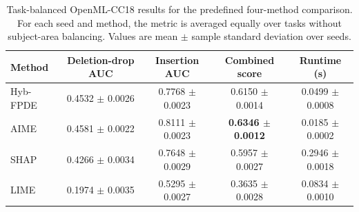 \begin{table}[!tbp]
    \caption{Task-balanced OpenML-CC18 results for the predefined four-method comparison. For each seed and method, the metric is averaged equally over tasks without subject-area balancing. Values are mean $\pm$ sample standard deviation over seeds.}
    \label{tab:task_weighted_results}
    \centering
    \begin{tabular}{lcccc}
        \toprule
        Method & Deletion-drop AUC & Insertion AUC & Combined score & Runtime (s)  \\
        \midrule
        Hyb-FPDE & 0.4532 $\pm$ 0.0026 & 0.7768 $\pm$ 0.0023 & 0.6150 $\pm$ 0.0014 & 0.0499 $\pm$ 0.0008 \\
        AIME & 0.4581 $\pm$ 0.0022 & 0.8111 $\pm$ 0.0023 & \textbf{0.6346 $\pm$ 0.0012} & 0.0185 $\pm$ 0.0002 \\
        SHAP & 0.4266 $\pm$ 0.0034 & 0.7648 $\pm$ 0.0029 & 0.5957 $\pm$ 0.0027 & 0.2946 $\pm$ 0.0018 \\
        LIME & 0.1974 $\pm$ 0.0035 & 0.5295 $\pm$ 0.0027 & 0.3635 $\pm$ 0.0028 & 0.0834 $\pm$ 0.0010 \\
        \bottomrule
    \end{tabular}
\end{table}
